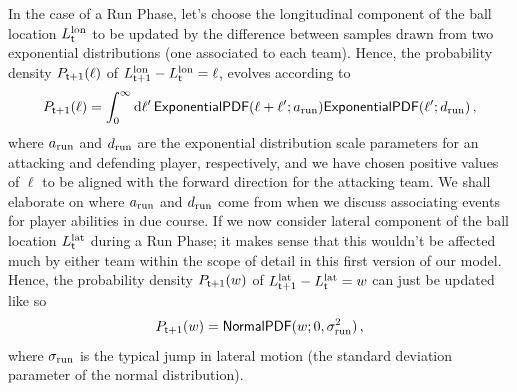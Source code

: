 In the case of a {\sf Run Phase}, let's choose the longitudinal component of the ball location $L^{\rm lon}_{{\sf t}}$ to be updated by the difference between samples drawn from two exponential distributions (one associated to each team). Hence, the probability density $P_{{\sf t}+1}(\ell )$ of $L^{\rm lon}_{{\sf t}+1}-L^{\rm lon}_{{\sf t}}=\ell$, evolves according to
\begin{align}
P_{{\sf t}+1}(\ell ) = \int^\infty_0 {\rm d}\ell'\, {\sf ExponentialPDF}(\ell + \ell'; a_{\rm run}){\sf ExponentialPDF}(\ell'; d_{\rm run}) \label{eq:longitudinal-motion-rugby} \,,
\end{align}
where $a_{\rm run}$ and $d_{\rm run}$ are the exponential distribution scale parameters for an attacking and defending player, respectively, and we have chosen positive values of $\ell$ to be aligned with the forward direction for the attacking team. We shall elaborate on where $a_{\rm run}$ and $d_{\rm run}$ come from when we discuss associating events for player abilities in due course. If we now consider lateral component of the ball location $L^{\rm lat}_{{\sf t}}$ during a {\sf Run Phase}; it makes sense that this wouldn't be affected much by either team within the scope of detail in this first version of our model. Hence, the probability density $P_{{\sf t}+1}(w)$ of $L^{\rm lat}_{{\sf t}+1}-L^{\rm lat}_{{\sf t}}=w$ can just be updated like so
\begin{align}
P_{{\sf t}+1}(w) = {\sf NormalPDF}(w; 0, \sigma_{\rm run}^2) \label{eq:lateral-motion-rugby} \,,
\end{align}
where $\sigma_{\rm run}$ is the typical jump in lateral motion (the standard deviation parameter of the normal distribution).

